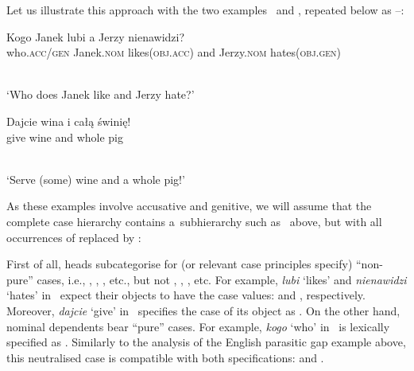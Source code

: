 \documentclass[output=paper]{langsci/langscibook}
\begin{document}
Let us illustrate this approach with the two  examples~ and , repeated below as –:
\begin{examples}
\item\label{ex:syn:pc:again} 
  \begin{gloss}
    Kogo Janek lubi a Jerzy nienawidzi? \\
    who.\textsc{acc/gen} Janek.\textsc{nom} likes(\textsc{obj.acc}) and Jerzy.\textsc{nom} hates(\textsc{obj.gen})
  \end{gloss}\\[\glosslen]
  ‘Who does Janek like and Jerzy hate?’
\item\label{ex:dis:pl:again}
  \begin{gloss}
    Dajcie wina i całą świnię! \\
    give wine\Gen{} and whole\Acc{} pig\Acc{}
  \end{gloss}\\[\glosslen]
  ‘Serve (some) wine and a whole pig!’
\end{examples}
As these examples involve accusative and genitive, we will assume that the complete case hierarchy contains a~subhierarchy such as~ above, but with all occurrences of  replaced by :
\begin{examples}
\item
{}
\end{examples}

First of all, heads subcategorise for (or relevant case principles specify) “non-pure” cases, i.e., , , , etc., but not , , , etc.  For example, \emph{lubi} ‘likes’ and \emph{nienawidzi} ‘hates’ in~ expect their objects to have the case values:  and , respectively.  Moreover, \emph{dajcie} ‘give’ in~ specifies the case of its object as .  On the other hand, nominal dependents bear “pure” cases.  For example, \emph{kogo} ‘who’ in~ is lexically specified as .  Similarly to the analysis of the English parasitic gap example above, this neutralised case is compatible with both specifications:  and .
\end{document}
